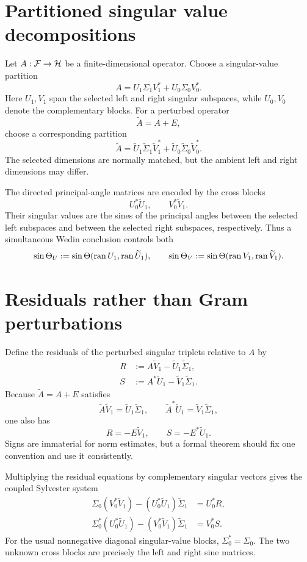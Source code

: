 \section{Partitioned singular value decompositions}

Let $A:\mathcal{F}\to\mathcal{H}$ be a finite-dimensional operator. Choose a singular-value partition
\[
 A=U_1\Sigma_1V_1^*+U_0\Sigma_0V_0^*.
\]
Here $U_1,V_1$ span the selected left and right singular subspaces, while $U_0,V_0$ denote the complementary blocks. For a perturbed operator
\[
 \widetilde A=A+E,
\]
choose a corresponding partition
\[
 \widetilde A=\widetilde U_1\widetilde\Sigma_1\widetilde V_1^*
                 +\widetilde U_0\widetilde\Sigma_0\widetilde V_0^*.
\]
The selected dimensions are normally matched, but the ambient left and right dimensions may differ.

The directed principal-angle matrices are encoded by the cross blocks
\[
 U_0^*\widetilde U_1,
 \qquad
 V_0^*\widetilde V_1.
\]
Their singular values are the sines of the principal angles between the selected left subspaces and between the selected right subspaces, respectively. Thus a simultaneous Wedin conclusion controls both
\[
 \sin\Theta_U:=\sin\Theta(\operatorname{ran} U_1,\operatorname{ran}\widetilde U_1),
 \qquad
 \sin\Theta_V:=\sin\Theta(\operatorname{ran} V_1,\operatorname{ran}\widetilde V_1).
\]

\section{Residuals rather than Gram perturbations}

Define the residuals of the perturbed singular triplets relative to $A$ by
\begin{align}
 R&:=A\widetilde V_1-\widetilde U_1\widetilde\Sigma_1,\\
 S&:=A^*\widetilde U_1-\widetilde V_1\widetilde\Sigma_1.
\end{align}
Because $\widetilde A=A+E$ satisfies
\[
 \widetilde A\widetilde V_1=\widetilde U_1\widetilde\Sigma_1,
 \qquad
 \widetilde A^*\widetilde U_1=\widetilde V_1\widetilde\Sigma_1,
\]
one also has
\[
 R=-E\widetilde V_1,
 \qquad
 S=-E^*\widetilde U_1.
\]
Signs are immaterial for norm estimates, but a formal theorem should fix one convention and use it consistently.

Multiplying the residual equations by complementary singular vectors gives the coupled Sylvester system
\begin{align}
 \Sigma_0(V_0^*\widetilde V_1)
 -(U_0^*\widetilde U_1)\widetilde\Sigma_1
 &=U_0^*R,\label{W-coupled-1}\\
 \Sigma_0^*(U_0^*\widetilde U_1)
 -(V_0^*\widetilde V_1)\widetilde\Sigma_1
 &=V_0^*S.\label{W-coupled-2}
\end{align}
For the usual nonnegative diagonal singular-value blocks, $\Sigma_0^*=\Sigma_0$. The two unknown cross blocks are precisely the left and right sine matrices.

